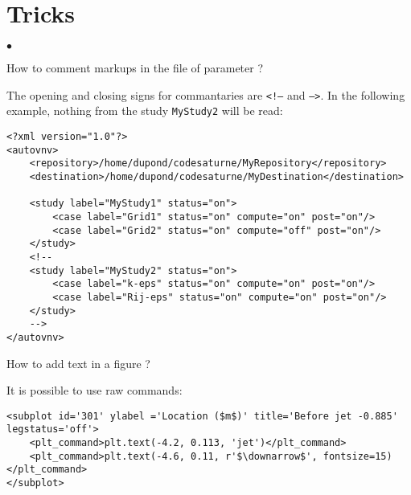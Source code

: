 \documentclass[a4paper,10pt,twoside]{csshortdoc}
\begin{document}
\section{Tricks}\label{sec:tricks}
\begin{list}{$\bullet$}{}
\item How to comment markups in the file of parameter ?

The opening and closing signs for commantaries are \texttt{<!--} and
\texttt{-->}. In the following example, nothing from the study
\texttt{MyStudy2} will be read:
\small
\begin{verbatim}
<?xml version="1.0"?>
<autovnv>
    <repository>/home/dupond/codesaturne/MyRepository</repository>
    <destination>/home/dupond/codesaturne/MyDestination</destination>

    <study label="MyStudy1" status="on">
        <case label="Grid1" status="on" compute="on" post="on"/>
        <case label="Grid2" status="on" compute="off" post="on"/>
    </study>
    <!--
    <study label="MyStudy2" status="on">
        <case label="k-eps" status="on" compute="on" post="on"/>
        <case label="Rij-eps" status="on" compute="on" post="on"/>
    </study>
    -->
</autovnv>
\end{verbatim}
\normalsize

\item How to add text in a figure ?

It is possible to use raw commands:
\small
\begin{verbatim}
<subplot id='301' ylabel ='Location ($m$)' title='Before jet -0.885' legstatus='off'>
    <plt_command>plt.text(-4.2, 0.113, 'jet')</plt_command>
    <plt_command>plt.text(-4.6, 0.11, r'$\downarrow$', fontsize=15)</plt_command>
</subplot>
 \end{verbatim}
\normalsize

\end{list}


%
\end{document}
